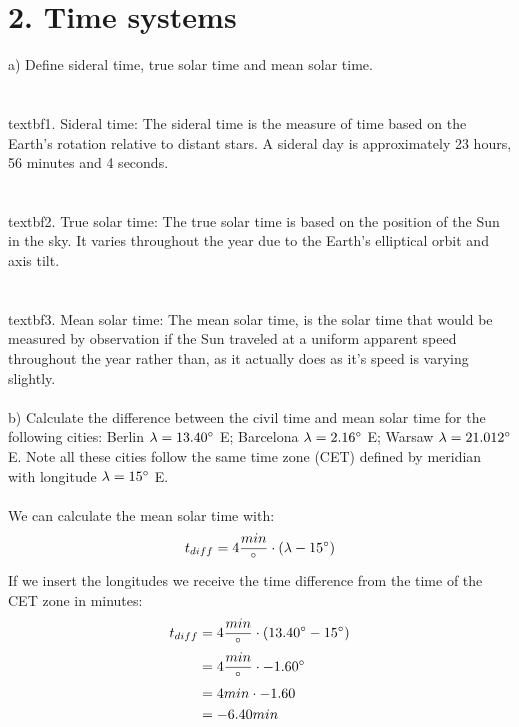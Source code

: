 \section*{2. Time systems}

a) Define sideral time, true solar time and mean solar time.\\
\\
\\textbf{1. Sideral time:} The sideral time is the measure of time based on the Earth's rotation relative
to distant stars. A sideral day is approximately 23 hours, 56 minutes and 4 seconds.\\
\\
\\textbf{2. True solar time:} The true solar time is based on the position of the Sun in the sky. It 
varies throughout the year due to the Earth's elliptical orbit and axis tilt.\\
\\
\\textbf{3. Mean solar time:} The mean solar time, is the solar time that would be measured by 
observation if the Sun traveled at a uniform apparent speed throughout the year rather than, as it 
actually does as it's speed is varying slightly.\\
\\
b) Calculate the difference between the civil time and mean solar time for the following cities: Berlin
$\lambda = 13.40 \degree$ E; Barcelona $\lambda = 2.16 \degree$ E; Warsaw $\lambda = 21.012 \degree$ E.
Note all these cities follow the same time zone (CET) defined by meridian with longitude 
$\lambda = 15 \degree$ E.\\
\\
We can calculate the mean solar time with:
\begin{equation*}
    t_{diff} = 4 \frac{min}{\degree} \cdot (\lambda - 15 \degree)
\end{equation*}
If we insert the longitudes we receive the time difference from the time of the CET zone in minutes:
\begin{equation*}
    \begin{split}
        t_{diff} &= 4 \frac{min}{\degree} \cdot (13.40 \degree - 15 \degree)\\
        &= 4 \frac{min}{\degree} \cdot - 1.60 \degree\\
        &= 4 min \cdot - 1.60\\
        &= -6.40 min 
    \end{split}
\end{equation*}
